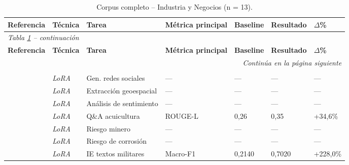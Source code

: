 \begin{longtable}{p{3.5cm} p{1.7cm} p{3.0cm} p{1.8cm} p{1.3cm} p{1.3cm} p{0.9cm}}
\caption{Corpus completo -- Industria y Negocios (n = 13).} \label{tab:apx_ib} \\
\toprule
\scriptsize\textbf{Referencia} & \scriptsize\textbf{Técnica} & \scriptsize\textbf{Tarea} & \scriptsize\textbf{Métrica principal} & \scriptsize\textbf{Baseline} & \scriptsize\textbf{Resultado} & \scriptsize\textbf{$\Delta$\%} \\
\midrule
\endfirsthead
\multicolumn{7}{l}{\scriptsize\textit{Tabla \ref{tab:apx_ib} -- continuación}} \\[2pt]
\toprule
\scriptsize\textbf{Referencia} & \scriptsize\textbf{Técnica} & \scriptsize\textbf{Tarea} & \scriptsize\textbf{Métrica principal} & \scriptsize\textbf{Baseline} & \scriptsize\textbf{Resultado} & \scriptsize\textbf{$\Delta$\%} \\
\midrule
\endhead
\midrule
\multicolumn{7}{r}{\scriptsize\textit{Continúa en la página siguiente}} \\
\endfoot
\bottomrule
\endlastfoot
\multicolumn{7}{l}{\scriptsize\textbf{\textit{PEFT}}} \\[2pt]
\scriptsize\autocite{chitrakala2025rltweet} & \scriptsize\textit{LoRA} & \scriptsize Gen. redes sociales & \scriptsize --- & \scriptsize --- & \scriptsize --- & \scriptsize --- \\
\scriptsize\autocite{han2025ft2} & \scriptsize\textit{LoRA} & \scriptsize Extracción geoespacial & \scriptsize --- & \scriptsize --- & \scriptsize --- & \scriptsize --- \\
\scriptsize\autocite{lin2024lora} & \scriptsize\textit{LoRA} & \scriptsize Análisis de sentimiento & \scriptsize --- & \scriptsize --- & \scriptsize --- & \scriptsize --- \\
\scriptsize\autocite{song2025lora} & \scriptsize\textit{LoRA} & \scriptsize Q\&A acuicultura & \scriptsize ROUGE-L & \scriptsize 0,26 & \scriptsize 0,35 & \scriptsize +34,6\% \\
\scriptsize\autocite{sun2024mirachatglm} & \scriptsize\textit{LoRA} & \scriptsize Riesgo minero & \scriptsize --- & \scriptsize --- & \scriptsize --- & \scriptsize --- \\
\scriptsize\autocite{wu2025lora} & \scriptsize\textit{LoRA} & \scriptsize Riesgo de corrosión & \scriptsize --- & \scriptsize --- & \scriptsize --- & \scriptsize --- \\
\scriptsize\autocite{yang2025hierarchic} & \scriptsize\textit{LoRA} & \scriptsize IE textos militares & \scriptsize Macro-F1 & \scriptsize 0,2140 & \scriptsize 0,7020 & \scriptsize +228,0\% \\

\end{longtable}
